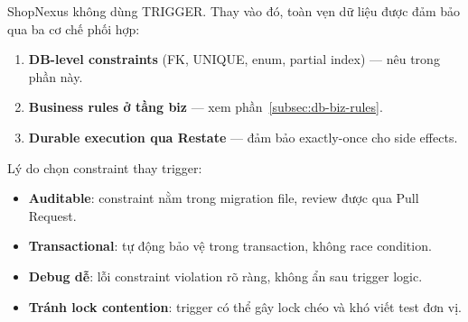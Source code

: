 ShopNexus không dùng TRIGGER. Thay vào đó, toàn vẹn dữ liệu được đảm bảo qua ba cơ chế phối hợp:

\begin{enumerate}[nosep]
    \item \textbf{DB-level constraints} (FK, UNIQUE, enum, partial index) --- nêu trong phần này.
    \item \textbf{Business rules ở tầng biz} --- xem phần~\ref{subsec:db-biz-rules}.
    \item \textbf{Durable execution qua Restate} --- đảm bảo exactly-once cho side effects.
\end{enumerate}

Lý do chọn constraint thay trigger:

\begin{itemize}[nosep]
    \item \textbf{Auditable}: constraint nằm trong migration file, review được qua Pull Request.
    \item \textbf{Transactional}: tự động bảo vệ trong transaction, không race condition.
    \item \textbf{Debug dễ}: lỗi constraint violation rõ ràng, không ẩn sau trigger logic.
    \item \textbf{Tránh lock contention}: trigger có thể gây lock chéo và khó viết test đơn vị.
\end{itemize}

